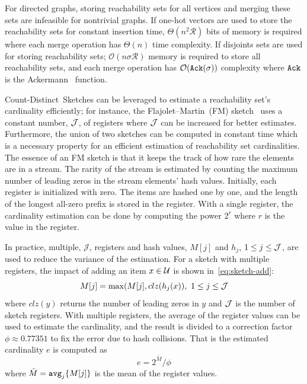 For directed graphs, storing reachability sets for all vertices and merging these sets are infeasible for nontrivial graphs. 
If one-hot vectors are used to store the reachability sets for constant insertion time, $\Theta(n^2\mathcal{R})$ bits of memory is required where each merge operation has $\Theta(n)$ time complexity. 
If disjoints sets are used for storing reachability sets; $\mathcal{O}(n{\sigma}\mathcal{R})$ 
memory is required to store all reachability sets, and each merge operation has $\mathcal{O}({\tt Ack}(\sigma))$ complexity where ${\tt Ack}$ is the Ackermann~\cite{ackermann} function. %


Count-Distinct~Sketches can be leveraged to estimate a reachability set's cardinality efficiently; for instance, the Flajolet–Martin~(FM) sketch~\cite{flajolet1985probabilistic} uses a constant number, ${\cal J}$, of registers where ${\cal J}$ can be increased for better estimates. Furthermore, the union of two sketches can be computed in constant time which is a necessary property for an efficient estimation of reachability set cardinalities. The essence of an FM sketch is that it keeps the track of how rare the elements are in a stream. The rarity of the stream is estimated by counting the maximum number of leading zeros in the stream elements' hash values. Initially, each register is initialized with zero. The items are hashed one by one, and the length of the longest all-zero prefix is stored in the register. With a single register, the cardinality estimation can be done by computing the power $2^r$ where $r$ is the value in the register.

In practice, multiple, ${\mathcal J}$, registers and hash values, $M[j]$ and $h_j$, $1 \leq j \leq {\cal J}$, are used to reduce the variance of the estimation. For a sketch with multiple registers, the impact of adding an item $x \in \cal{U}$ is shown in~\eqref{eq:sketch-add}:
\begin{equation}
    \label{eq:sketch-add}
    M[j] = \max(M[j], clz(h_j(x)),~1 \leq j \leq {\cal J}
\end{equation} where $clz(y)$ returns the number of leading zeros in $y$ and ${\cal J}$ is the number of sketch registers. With multiple registers, the average of the register values can be used to estimate the cardinality, and the result is divided to a correction factor $\phi \approx 0.77351$ to fix the error due to hash collisions. That is the estimated cardinality $e$ is computed as
\begin{equation}
    \label{eq:sketch-estimate}
    e = 2^{\bar{M}}/\phi
\end{equation} 
where $\bar{M} = {\tt{avg}}_j\{M[j]\}$ is the mean of the register values.

